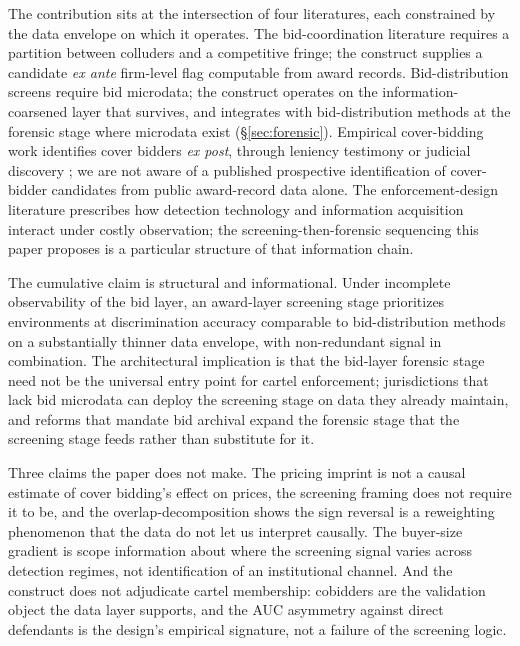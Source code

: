 The contribution sits at the intersection of four literatures,
each constrained by the data envelope on which it operates. The
bid-coordination literature
\citep{bajari2003deciding,porter1993detection,conley2016detecting}
requires a partition between colluders and a competitive fringe;
the construct supplies a candidate \emph{ex ante} firm-level flag
computable from award records. Bid-distribution screens
\citep{imhof2019detecting,wallimann2023machine,huber2019machine}
require bid microdata; the construct operates on the
information-coarsened layer that survives, and integrates with
bid-distribution methods at the forensic stage where microdata
exist (\S\ref{sec:forensic}). Empirical cover-bidding work
identifies cover bidders \emph{ex post}, through leniency
testimony or judicial discovery
\citep{porter1999ohio,pesendorfer2000study,asker2010leniency,kawai2022detection};
we are not aware of a published prospective identification of
cover-bidder candidates from public award-record data alone. The
enforcement-design literature
\citep{becker1968crime,stigler1970optimum,harrington2008detecting,baker2002case}
prescribes how detection technology and information acquisition
interact under costly observation; the screening-then-forensic
sequencing this paper proposes is a particular structure of that
information chain.

The cumulative claim is structural and informational. Under
incomplete observability of the bid layer, an award-layer
screening stage prioritizes environments at discrimination
accuracy comparable to bid-distribution methods on a substantially
thinner data envelope, with non-redundant signal in combination.
The architectural implication is that the bid-layer forensic
stage need not be the universal entry point for cartel
enforcement; jurisdictions that lack bid microdata can deploy the
screening stage on data they already maintain, and reforms that
mandate bid archival expand the forensic stage that the screening
stage feeds rather than substitute for it.

Three claims the paper does not make. The pricing imprint is not
a causal estimate of cover bidding's effect on prices, the
screening framing does not require it to be, and the
overlap-decomposition shows the sign reversal is a reweighting
phenomenon that the data do not let us interpret causally. The
buyer-size gradient is scope information about where the
screening signal varies across detection regimes, not
identification of an institutional channel. And the construct
does not adjudicate cartel membership: cobidders are the validation
object the data layer supports, and the AUC asymmetry against
direct defendants is the design's empirical signature, not a
failure of the screening logic.

